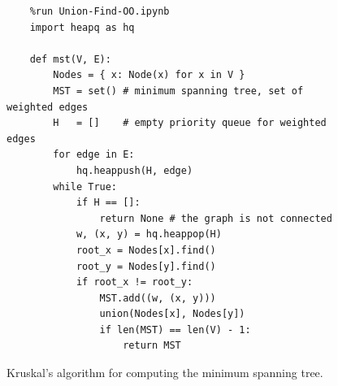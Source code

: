 \begin{figure}[!ht]
\centering
\begin{verbatim}
    %run Union-Find-OO.ipynb
    import heapq as hq     
                
    def mst(V, E):
        Nodes = { x: Node(x) for x in V }
        MST = set() # minimum spanning tree, set of weighted edges
        H   = []    # empty priority queue for weighted edges
        for edge in E:
            hq.heappush(H, edge)
        while True:
            if H == []:
                return None # the graph is not connected
            w, (x, y) = hq.heappop(H)
            root_x = Nodes[x].find()
            root_y = Nodes[y].find()
            if root_x != root_y:
                MST.add((w, (x, y)))
                union(Nodes[x], Nodes[y])
                if len(MST) == len(V) - 1:
                    return MST
\end{verbatim}
\vspace*{-0.3cm}
\caption{Kruskal's algorithm for computing the minimum spanning tree.}
\label{fig:Kruskal.ipynb}
\end{figure}

